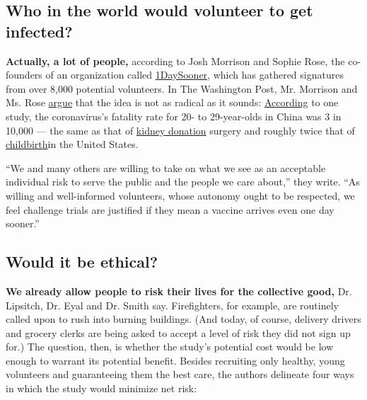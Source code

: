 \hypertarget{who-in-the-world-would-volunteer-to-get-infected}{%
\subsection{Who in the world would volunteer to get
infected?}\label{who-in-the-world-would-volunteer-to-get-infected}}

\textbf{Actually, a lot of people,} according to Josh Morrison and
Sophie Rose, the co-founders of an organization called
\href{https://1daysooner.org/}{1DaySooner}, which has gathered
signatures from over 8,000 potential volunteers. In The Washington Post,
Mr. Morrison and Ms. Rose
\href{https://www.washingtonpost.com/outlook/2020/04/27/vaccine-infection-volunteer-coronavirus/}{argue}
that the idea is not as radical as it sounds:
\href{https://www.thelancet.com/journals/laninf/article/PIIS1473-3099(20)30243-7/fulltext}{According}
to one study, the coronavirus's fatality rate for 20- to 29-year-olds in
China was 3 in 10,000 --- the same as that of
\href{https://www.ncbi.nlm.nih.gov/pubmed/22732041}{kidney donation}
surgery and roughly twice that of
\href{https://www.cdc.gov/reproductivehealth/maternal-mortality/pregnancy-mortality-surveillance-system.htm}{childbirth}in
the United States.

``We and many others are willing to take on what we see as an acceptable
individual risk to serve the public and the people we care about,'' they
write. ``As willing and well-informed volunteers, whose autonomy ought
to be respected, we feel challenge trials are justified if they mean a
vaccine arrives even one day sooner.''

\hypertarget{would-it-be-ethical}{%
\subsection{Would it be ethical?}\label{would-it-be-ethical}}

\textbf{We already allow people to risk their lives for the collective
good,} Dr. Lipsitch, Dr. Eyal and Dr. Smith say. Firefighters, for
example, are routinely called upon to rush into burning buildings. (And
today, of course, delivery drivers and grocery clerks are being asked to
accept a level of risk they did not sign up for.) The question, then, is
whether the study's potential cost would be low enough to warrant its
potential benefit. Besides recruiting only healthy, young volunteers and
guaranteeing them the best care, the authors delineate four ways in
which the study would minimize net risk:

